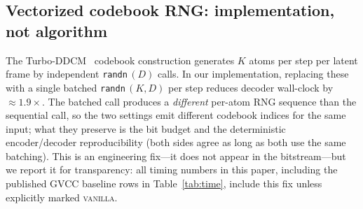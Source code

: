 \subsection{Vectorized codebook RNG: implementation, not algorithm}
\label{sec:abl-vec}

The Turbo-DDCM~\cite{vaisman2025turboddcm} codebook construction
generates $K$ atoms per step per latent frame by independent
\texttt{randn}\,$(D)$ calls. In our implementation, replacing these with
a single batched \texttt{randn}\,$(K, D)$ per step reduces decoder
wall-clock by $\approx 1.9\times$. The batched call produces a
\emph{different} per-atom RNG sequence than the sequential call, so the
two settings emit different codebook indices for the same input; what
they preserve is the bit budget and the deterministic encoder/decoder
reproducibility (both sides agree as long as both use the same
batching). This is an engineering fix---it does not
appear in the bitstream---but we report it for transparency: all timing
numbers in this paper, including the published GVCC baseline rows in
Table~\ref{tab:time}, include this fix unless explicitly marked
\textsc{vanilla}.
